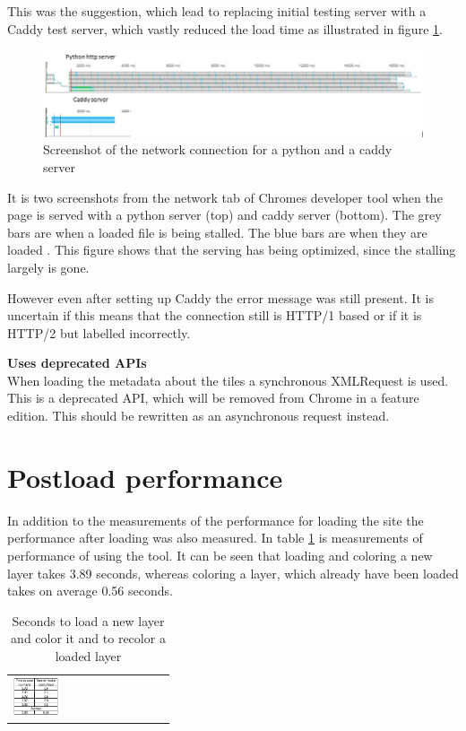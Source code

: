 This was the suggestion, which lead to replacing initial testing server with a Caddy test server, which vastly reduced the load time as illustrated in figure \ref{CaddyVsPython}.

\begin{figure} [H]
	\centering
	\includegraphics[width=1\textwidth]{Pictures/CaddyVsPython}
	\caption{Screenshot of the network connection for a python and a caddy server}
	\label{CaddyVsPython}
\end{figure}

It is two screenshots from the network tab of Chromes developer tool when the page is served with a python server (top) and caddy server (bottom). 
The grey bars are when a loaded file is being stalled. The blue bars are when they are loaded \citep{OnlySix}. This figure shows that the serving has being optimized, since the stalling largely is gone. 

However even after setting up Caddy the error message was still present. It is uncertain if this means that the connection still is HTTP/1 based or if it is HTTP/2 but labelled incorrectly. 




\textbf{Uses deprecated APIs}\\
When loading the metadata about the tiles a synchronous XMLRequest is used. This is a deprecated API, which will be removed from Chrome in a feature edition. This should be rewritten as an asynchronous request instead.
\citep{OldApis}

\section{Postload performance}

In addition to the measurements of the performance for loading the site the performance after loading was also measured. In table \ref{tabPostloadPerformance} is measurements of performance of using the tool. It can be seen that loading and coloring a new layer takes 3.89 seconds, whereas coloring a layer, which already have been loaded takes on average 0.56 seconds. 

\begin{table}[htbp]
	\centering
	\begin{tabular}{l}
		\includegraphics[width=0.3\textwidth]{Pictures/tabPostloadPerformance}
	\end{tabular}
	\caption{Seconds to load a new layer and color it and to recolor a loaded layer}
	\label{tabPostloadPerformance}
\end{table}